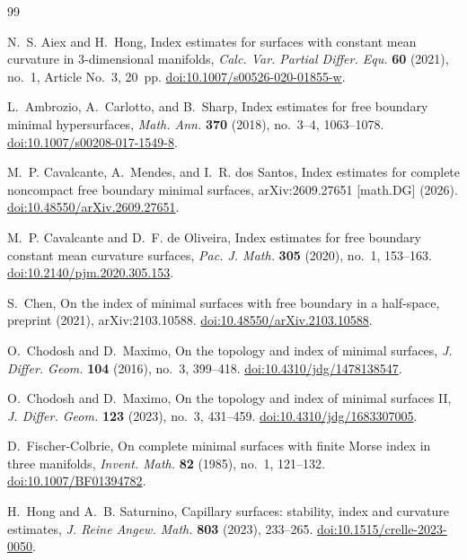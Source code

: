 \documentclass[11pt]{amsart}
\numberwithin{equation}{section}
\theoremstyle{definition}
\theoremstyle{remark}
\begin{document}
\begin{thebibliography}{99}

N.~S. Aiex and H.~Hong,
Index estimates for surfaces with constant mean curvature in
$3$-dimensional manifolds,
\emph{Calc. Var. Partial Differ. Equ.} \textbf{60} (2021),
no.~1, Article No.~3, 20~pp.
\href{https://doi.org/10.1007/s00526-020-01855-w}
{doi:10.1007/s00526-020-01855-w}.

L.~Ambrozio, A.~Carlotto, and B.~Sharp,
Index estimates for free boundary minimal hypersurfaces,
\emph{Math. Ann.} \textbf{370} (2018),
no.~3--4, 1063--1078.
\href{https://doi.org/10.1007/s00208-017-1549-8}
{doi:10.1007/s00208-017-1549-8}.

M.~P. Cavalcante, A.~Mendes, and I.~R. dos Santos,
Index estimates for complete noncompact free boundary minimal surfaces,
arXiv:2609.27651 [math.DG] (2026).
\href{https://doi.org/10.48550/arXiv.2609.27651}
{doi:10.48550/arXiv.2609.27651}.

M.~P. Cavalcante and D.~F. de Oliveira,
Index estimates for free boundary constant mean curvature surfaces,
\emph{Pac. J. Math.} \textbf{305} (2020),
no.~1, 153--163.
\href{https://doi.org/10.2140/pjm.2020.305.153}
{doi:10.2140/pjm.2020.305.153}.

S.~Chen,
On the index of minimal surfaces with free boundary in a half-space,
preprint (2021), arXiv:2103.10588.
\href{https://doi.org/10.48550/arXiv.2103.10588}
{doi:10.48550/arXiv.2103.10588}.

O.~Chodosh and D.~Maximo,
On the topology and index of minimal surfaces,
\emph{J. Differ. Geom.} \textbf{104} (2016),
no.~3, 399--418.
\href{https://doi.org/10.4310/jdg/1478138547}
{doi:10.4310/jdg/1478138547}.

O.~Chodosh and D.~Maximo,
On the topology and index of minimal surfaces II,
\emph{J. Differ. Geom.} \textbf{123} (2023),
no.~3, 431--459.
\href{https://doi.org/10.4310/jdg/1683307005}
{doi:10.4310/jdg/1683307005}.

D.~Fischer-Colbrie,
On complete minimal surfaces with finite Morse index in
three manifolds,
\emph{Invent. Math.} \textbf{82} (1985),
no.~1, 121--132.
\href{https://doi.org/10.1007/BF01394782}
{doi:10.1007/BF01394782}.

H.~Hong and A.~B. Saturnino,
Capillary surfaces: stability, index and curvature estimates,
\emph{J. Reine Angew. Math.} \textbf{803} (2023), 233--265.
\href{https://doi.org/10.1515/crelle-2023-0050}
{doi:10.1515/crelle-2023-0050}.


\end{thebibliography}
\end{document}
